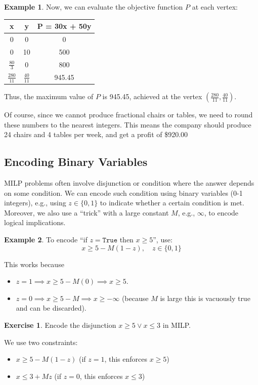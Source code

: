 \documentclass[oneside,11pt,dvipsnames]{book}
\numberwithin{equation}{section}
\theoremstyle{definition}
\newtheorem{example}{Example}[section]
\newtheorem{exercise}{Exercise}[section]
\newtheorem{solutione}{Solution}[section]
\theoremstyle{remark}
\newenvironment{solution}{%
  \ifbool{showsol}{%
    \begin{solutione}%
  }{%
    \comment %
  }%
}{%
  \ifbool{showsol}{%
    \end{solutione}%
  }{%
    \endcomment %
  }%
}
\begin{document}
\begin{example}
Now, we can evaluate the objective function $P$ at each vertex:

\begin{center}
\begin{tabular}{ccc}
\hline
x & y & P = 30x + 50y \\
\hline
0 & 0 & 0 \\
0 & 10 & 500 \\
$\frac{80}{3}$ & 0 & 800 \\
$\frac{280}{11}$ & $\frac{40}{11}$ &945.45 \\
\hline
\end{tabular}
\end{center}

Thus, the maximum value of $P$ is 945.45, achieved at the vertex $(\frac{280}{11},\frac{40}{11})$. 

Of course, since we cannot produce fractional chairs or tables, we need to round these numbers to the nearest integers.
This means the company should produce 24 chairs and 4 tables per week, and get a profit of \$920.00

\end{example}



\subsection{Encoding Binary Variables}
MILP problems often involve disjunction or condition where the answer depends on some condition.  We can encode such condition using binary variables (0-1 integers), e.g., using  $z \in \{0,1\}$ to indicate whether a certain condition is met.  Moreover, we also use a ``trick'' with a large constant $M$, e.g., $\infty$, to encode logical implications.

\begin{example}
To encode ``if $z = \texttt{True}$ then $x \geq 5$'', use:
\[
x \geq 5 - M(1-z), \quad z \in \{0,1\}
\]


This works because 
\begin{itemize}
 \item $z=1 \implies x \ge 5 - M(0) \implies x \geq 5$.
 \item $z=0 \implies x \geq 5 - M \implies x \ge -\infty$ (because $M$ is large this is vacuously true and can be discarded).
\end{itemize}

\end{example}


\begin{exercise}
Encode the disjunction $x \geq 5 \lor x \leq 3$ in MILP.

\begin{solution}
    We use two constraints:
    \begin{itemize}
    \item $x \geq 5 - M(1-z)$ (if $z=1$, this enforces $x \geq 5$)
    \item $x \leq 3 + Mz$ (if $z=0$, this enforces $x \leq 3$)
    \end{itemize}
\end{solution}
\end{exercise}
\end{document}
